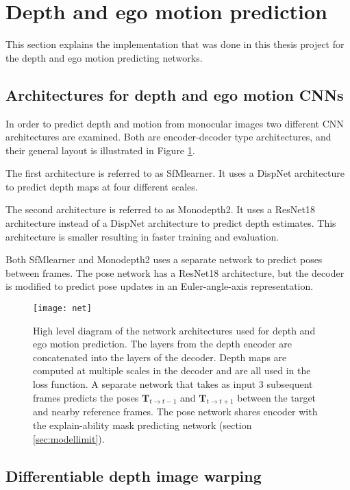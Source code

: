 \section{Depth and ego motion prediction}

This section explains the implementation that was done in this thesis project for the depth and ego motion predicting networks.

\subsection{Architectures for depth and ego motion CNNs}

In order to predict depth and motion from monocular images two different CNN architectures are examined. Both are encoder-decoder type architectures, and their general layout is illustrated in Figure \ref{fig:net}.

The first architecture is referred to as SfMlearner\cite{sfmlearner}. It uses a DispNet\cite{dispnet} architecture to predict depth maps at four different scales.

The second architecture is referred to as Monodepth2\cite{monodepth2}. It uses a ResNet18 architecture instead of a DispNet architecture to predict depth estimates. This architecture is smaller resulting in faster training and evaluation.

Both SfMlearner and Monodepth2 uses a separate network to predict poses between frames. The pose network has a ResNet18\cite{resnet} architecture, but the decoder is modified to predict pose updates in an Euler-angle-axis representation.

\begin{figure}[H]
	\centering
	\texttt{[image: net]}
	\caption{High level diagram of the network architectures used for depth and ego motion prediction. The layers from the depth encoder are concatenated into the layers of the decoder. Depth maps are computed at multiple scales in the decoder and are all used in the loss function. A separate network that takes as input 3 subsequent frames predicts the poses $\textbf{T}_{t\rightarrow t-1}$ and $\textbf{T}_{t\rightarrow t+1}$ between the target and nearby reference frames. The pose network shares encoder with the explain-ability mask predicting network (section \ref{sec:modellimit}).}
	\label{fig:net}
\end{figure}

\subsection{Differentiable depth image warping}
\label{sec:diffwarp}

